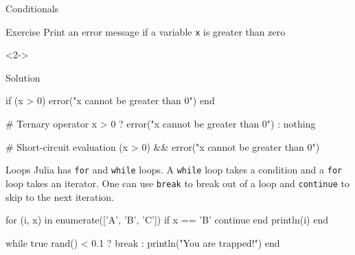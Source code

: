 \documentclass{beamer}
\newenvironment{Boxx}{\begin{tcolorbox}[standard jigsaw, opacityframe=0.8, opacityback=0.0]}{\end{tcolorbox}}
\begin{document}
\begin{frame}[fragile]{Conditionals}
	\begin{overlayarea}{\linewidth}{7cm}
	\begin{block}{Exercise}
	Print an error message if a variable \verb|x| is greater than zero
	\end{block}
	\vfill
	\begin{onlyenv}<2->
	\begin{block}{Solution}
		\vspace*{1mm}
		\begin{jllisting}[mathescape]
  if (x > 0) error("x cannot be greater than 0") end
	
  # Ternary operator		
  x > 0 ? error("x cannot be greater than 0") : nothing
			
  # Short-circuit evaluation
  (x > 0) && error("x cannot be greater than 0")
		\end{jllisting}
	\vspace*{1mm}
	\end{block}
\end{onlyenv}
\end{overlayarea}
\end{frame}

\begin{frame}[fragile]{Loops}
  Julia has \verb|for| and \verb|while| loops. A \verb|while| loop takes a condition and a \verb|for| loop takes an iterator.
  One can use \verb|break| to break out of a loop and \verb|continue| to skip to the next iteration. %
  	\vspace*{3mm}
  \begin{Boxx}
  \begin{jllisting}
  for (i, x) in enumerate(['A', 'B', 'C'])
    if x == 'B'
      continue
    end
    println(i)
  end

  while true
    rand() < 0.1 ? break : println("You are trapped!")
  end
  \end{jllisting}
\end{Boxx}
\end{frame}
\end{document}
